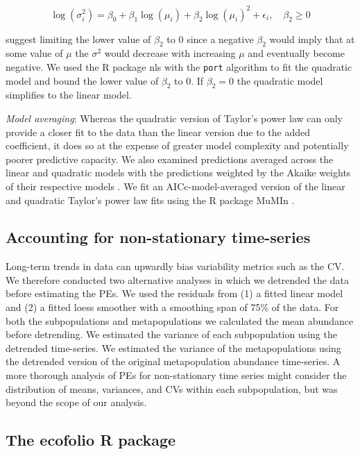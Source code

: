 \begin{equation}
  \log(\sigma^2_i) = \beta_0 + \beta_1 \log(\mu_i) + \beta_2 \log(\mu_i)^2 +
  \epsilon_i, \quad \beta_2 \ge 0
  \label{eq:quad-taylor}
\end{equation}

\noindent
\citet{perry1992} suggest limiting the lower value of $\beta_2$ to $0$ since
a negative $\beta_2$ would imply that at some value of $\mu$ the $\sigma^2$
would decrease with increasing $\mu$ and eventually become negative. We used
the R package nls \citep{r2013} with the \texttt{port} algorithm
to fit the quadratic model and bound the lower value of $\beta_2$ to $0$. If
$\beta_2 = 0$ the quadratic model simplifies to the linear model.

\textit{Model averaging}: Whereas the quadratic version of Taylor's power law
can only provide a closer fit to the data than the linear version due to the
added coefficient, it does so at the expense of greater model complexity and
potentially poorer predictive capacity. We also examined predictions averaged
across the linear and quadratic models with the predictions weighted by the
Akaike weights of their respective models \citep{burnham2002}. We fit an
AICc-model-averaged version of the linear and quadratic Taylor's power law fits
using the R package MuMIn \citep{barton2012}.

\subsection{Accounting for non-stationary time-series}

Long-term trends in data can upwardly bias variability metrics such as the CV.
We therefore conducted two alternative analyses in which we detrended
the data before estimating the PEs. We used the residuals from (1) a fitted
linear model and (2) a fitted loess smoother \citep[\texttt{loess}
function;][]{r2013} with a smoothing span of 75\% of the data. For both
the subpopulations and metapopulations we calculated the mean abundance before
detrending. We estimated the variance of each subpopulation using the detrended
time-series. We estimated the variance of the metapopulations using the
detrended version of the original metapopulation abundance time-series.
A more thorough analysis of PEs for non-stationary time series might
consider the distribution of means, variances, and CVs within each
subpopulation, but was beyond the scope of our analysis.

\subsection{The ecofolio R package}

